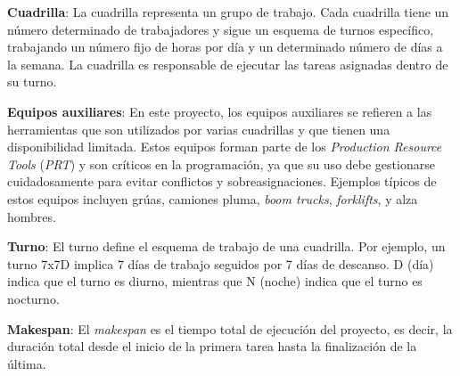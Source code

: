 \documentclass{article}
\begin{document}

\textbf{Cuadrilla}: La cuadrilla representa un grupo de trabajo. Cada cuadrilla tiene un número determinado de trabajadores y sigue un esquema de turnos específico, trabajando un número fijo de horas por día y un determinado número de días a la semana. La cuadrilla es responsable de ejecutar las tareas asignadas dentro de su turno.

\textbf{Equipos auxiliares}: En este proyecto, los equipos auxiliares se refieren a las herramientas que son utilizados por varias cuadrillas y que tienen una disponibilidad limitada. Estos equipos forman parte de los \textit{Production Resource Tools} (\textit{PRT}) y son críticos en la programación, ya que su uso debe gestionarse cuidadosamente para evitar conflictos y sobreasignaciones. Ejemplos típicos de estos equipos incluyen grúas, camiones pluma, \textit{boom trucks}, \textit{forklifts}, y alza hombres.

\textbf{Turno}: El turno define el esquema de trabajo de una cuadrilla. Por ejemplo, un turno 7x7D implica 7 días de trabajo seguidos por 7 días de descanso. D (día) indica que el turno es diurno, mientras que N (noche) indica que el turno es nocturno.

\textbf{Makespan}: El \textit{makespan} es el tiempo total de ejecución del proyecto, es decir, la duración total desde el inicio de la primera tarea hasta la finalización de la última.



\end{document}
